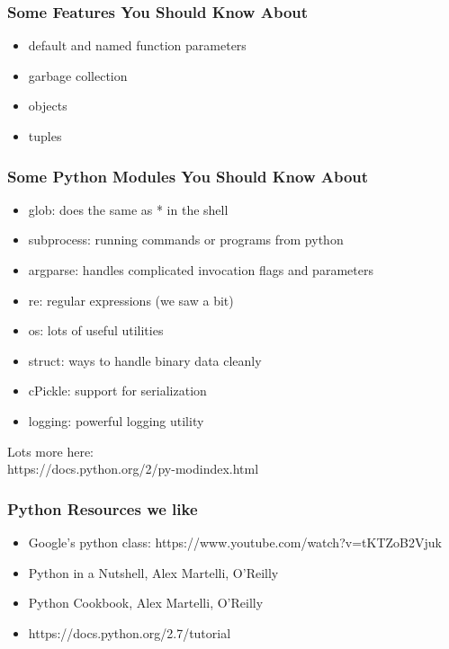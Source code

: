 \documentclass[10pt]{beamer}
\begin{document}
\begin{frame}[fragile]
\frametitle{Some Features You Should Know About}

\begin{itemize}
\item default and named function parameters
\item garbage collection
\item objects
\item tuples
\end{itemize}

\end{frame}

\begin{frame}[fragile]
\frametitle{Some Python Modules You Should Know About}

\begin{itemize}
\item glob: does the same as * in the shell
\item subprocess: running commands or programs from python
\item argparse: handles complicated invocation flags and parameters
\item re: regular expressions (we saw a bit)
\item os: lots of useful utilities
\item struct: ways to handle binary data cleanly
\item cPickle: support for serialization
\item logging: powerful logging utility
\end{itemize}

\vspace{5mm}
Lots more here:\\
https://docs.python.org/2/py-modindex.html

\end{frame}

\begin{frame}[fragile]
\frametitle{Python Resources we like}

\begin{itemize}
\item Google's python class: https://www.youtube.com/watch?v=tKTZoB2Vjuk
\item Python in a Nutshell, Alex Martelli, O'Reilly
\item Python Cookbook, Alex Martelli, O'Reilly
\item https://docs.python.org/2.7/tutorial
\end{itemize}

\end{frame}
\end{document}
